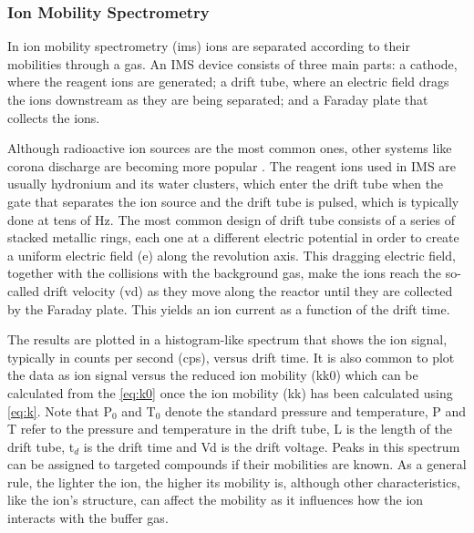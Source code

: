 \subsubsection{Ion Mobility Spectrometry}
In ion mobility spectrometry (\acrshort{ims}) ions are separated according to their mobilities through a gas. 
An IMS device consists of three main parts:
a cathode, where the reagent ions are generated; a drift tube, where an electric field drags the ions downstream as they are being separated; and a Faraday plate that collects the ions.


Although radioactive ion sources are the most common ones, other systems like corona discharge are becoming more popular \cite{GonzalezMendez2017939,michalczuk2019isomer}. The reagent ions used in IMS are usually hydronium and its water clusters, which enter the drift tube when the gate that separates the ion source and the drift tube is pulsed, which is typically done at tens of Hz. The most common design of drift tube consists of a series of stacked metallic rings, each one at a different electric potential in order to create a uniform electric field (\acrshort{e}) along the revolution axis. This dragging electric field, together with the collisions with the background gas, make the ions reach the so-called drift velocity (\acrshort{vd}) as they move along the reactor until they are collected by the Faraday plate. This yields an ion current as a function of the drift time.

The results are plotted in a histogram-like spectrum that shows the ion signal, typically in counts per second (\acrshort{cps}), versus drift time. It is also common to plot the data as ion signal versus the reduced ion mobility (\acrshort{kk0}) which can be calculated from the  \autoref{eq:k0} once the ion mobility (\acrshort{kk}) has been calculated using \autoref{eq:k}. Note that P$_0$ and T$_0$ denote the standard   pressure and temperature,
P and T refer to the pressure and temperature in the drift tube,
L is the length of the drift tube, t$_d$ is the drift time and \acrshort{Vd} is the drift voltage.
Peaks in this spectrum can be assigned to targeted compounds if their mobilities are known. As a general rule, the lighter the ion, the higher its mobility is, although other characteristics, like the ion's structure, can affect the mobility as it influences how the ion interacts with the buffer gas.


